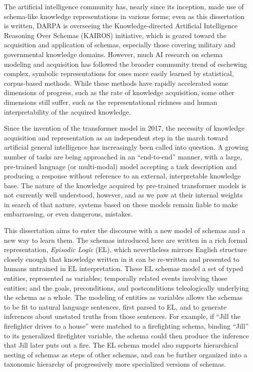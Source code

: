 The artificial intelligence community has, nearly since its inception, made use of schema-like knowledge representations in various forms; even as this dissertation is written, DARPA is overseeing the Knowledge-directed Artificial Intelligence Reasoning Over Schemas (KAIROS) initiative, which is geared toward the acquisition and application of schemas, especially those covering military and governmental knowledge domains. However, much AI research on schema modeling and acquisition has followed the broader community trend of eschewing complex, symbolic representations for ones more easily learned by statistical, corpus-based methods. While these methods have rapidly accelerated some dimensions of progress, such as the rate of knowledge acquisition, some other dimensions still suffer, such as the representational richness and human interpretability of the acquired knowledge.

Since the invention of the transformer model in 2017, the necessity of knowledge acquisition and representation as an independent step in the march toward artificial general intelligence has increasingly been called into question. A growing number of tasks are being approached in an ``end-to-end'' manner, with a large, pre-trained language (or multi-modal) model accepting a task description and producing a response without reference to an external, interpretable knowledge base. The nature of the knowledge acquired by pre-trained transformer models is not currently well understood, however, and as we paw at their internal weights in search of that nature, systems based on these models remain liable to make embarrassing, or even dangerous, mistakes.

This dissertation aims to enter the discourse with a new model of schemas and a new way to learn them. The schemas introduced here are written in a rich formal representation, \textit{Episodic Logic} (EL), which nevertheless mirrors English structure closely enough that knowledge written in it can be re-written and presented to humans untrained in EL interpretation. These EL schemas model a set of typed entities, represented as variables; temporally related events involving those entities; and the goals, preconditions, and postconditions teleologically underlying the schema as a whole. The modeling of entities as variables allows the schemas to be fit to natural language sentences, first parsed to EL, and to generate inferences about unstated truths from those sentences. For example, if ``Jill the firefighter drives to a house'' were matched to a firefighting schema, binding ``Jill'' to its generalized firefighter variable, the schema could then produce the inference that Jill later puts out a fire. The EL schema model also supports hierarchical nesting of schemas as steps of other schemas, and can be further organized into a taxonomic hierarchy of progressively more specialized versions of schemas.

